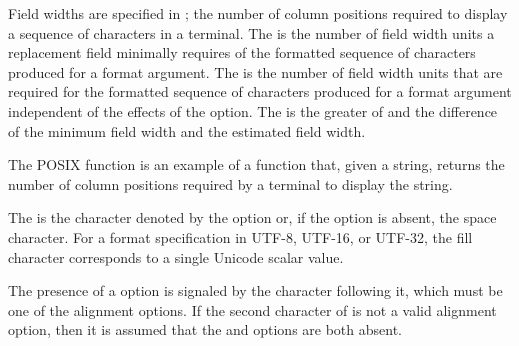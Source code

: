 \pnum
Field widths are specified in ;
the number of column positions required to display a sequence of
characters in a terminal.
The 
is the number of field width units a replacement field minimally requires of
the formatted sequence of characters produced for a format argument.
The  is the number of field width units
that are required for the formatted sequence of characters
produced for a format argument independent of
the effects of the  option.
The  is the greater of  and
the difference of the minimum field width and the estimated field width.

\begin{note}
The POSIX  function is an example of a function that,
given a string, returns the number of column positions required by
a terminal to display the string.
\end{note}

\pnum
The  is the character denoted by
the  option or,
if the  option is absent, the space character.
For a format specification in UTF-8, UTF-16, or UTF-32,
the fill character corresponds to a single Unicode scalar value.
\begin{note}
The presence of a  option
is signaled by the character following it,
which must be one of the alignment options.
If the second character of 
is not a valid alignment option,
then it is assumed that
the  and  options
are both absent.
\end{note}

